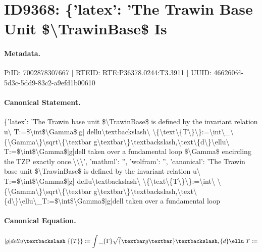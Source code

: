 \section*{ID9368: \{'latex': 'The Trawin Base Unit \$\textbackslash{}TrawinBase\$ Is}
\paragraph{Metadata.}
PiID: 7002878307667 | RTEID: RTE:P36378.0244:T3.3911 | UUID: 466260fd-5d3c-5dd9-83c2-a9efd1b00610

\paragraph{Canonical Statement.}
\{'latex': 'The Trawin base unit \$\textbackslash{}TrawinBase\$ is defined by the invariant relation u\textbackslash{} T:=\$\textbackslash{}int\$\textbackslash{}Gamma\$|g| dellu\textbackslash{}textbackslash\textbackslash{} \textbackslash{}\{\textbackslash{}text\textbackslash{}\{T\textbackslash{}\}\textbackslash{}\}:=\textbackslash{}int\textbackslash{}\_\textbackslash{}\{\textbackslash{}Gamma\textbackslash{}\}\textbackslash{}sqrt\textbackslash{}\{\textbackslash{}textbar g\textbackslash{}textbar\textbackslash{}\}\textbackslash{}textbackslash,\textbackslash{}text\textbackslash{}\{d\textbackslash{}\}\textbackslash{}ellu\textbackslash{} T:=\$\textbackslash{}int\$\textbackslash{}Gamma\$|g|dell taken over a fundamental loop \$\textbackslash{}Gamma\$ encircling the TZP exactly once.\textbackslash{}\textbackslash{}\textbackslash{}', 'mathml': '', 'wolfram': '', 'canonical': 'The Trawin base unit \$\textbackslash{}TrawinBase\$ is defined by the invariant relation u\textbackslash{} T:=\$\textbackslash{}int\$\textbackslash{}Gamma\$|g| dellu\textbackslash{}textbackslash\textbackslash{} \textbackslash{}\{\textbackslash{}text\textbackslash{}\{T\textbackslash{}\}\textbackslash{}\}:=\textbackslash{}int\textbackslash{} \textbackslash{}\{\textbackslash{}Gamma\textbackslash{}\}\textbackslash{}sqrt\textbackslash{}\{\textbackslash{}textbar g\textbackslash{}textbar\textbackslash{}\}\textbackslash{}textbackslash,\textbackslash{}text\textbackslash{}\{d\textbackslash{}\}\textbackslash{}ellu\textbackslash{}\_T:=\$\textbackslash{}int\$\textbackslash{}Gamma\$|g|dell taken over a fundamental loop

\paragraph{Canonical Equation.}
\[
|g| dellu\textbackslash\ \{\text\{T\}\}:=\int\_\{\Gamma\}\sqrt\{\textbar g\textbar\}\textbackslash,\text\{d\}\ellu\ T:=
\]

